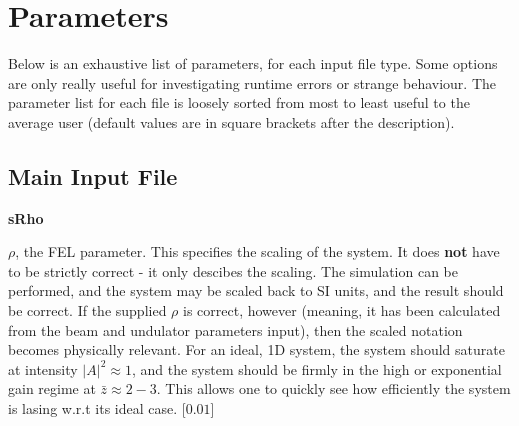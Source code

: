 \documentclass[12pt]{article}%
\begin{document}





\newpage

\section{Parameters}


Below is an exhaustive list of parameters, for each input file type. Some options are only really useful for investigating runtime errors or strange behaviour. The parameter list for each file is loosely sorted from most to least useful to the average user (default values are in square brackets after the description).


\subsection{Main Input File}

{\bf sRho}

$\rho$, the FEL parameter. This specifies the scaling of the system. It does {\bf not} have to be strictly correct - it only descibes the scaling. The simulation can be performed, and the system may be scaled back to SI units, and the result should be correct. If the supplied $\rho$ is correct, however (meaning, it has been calculated from the beam and undulator parameters input), then the scaled notation becomes physically relevant. For an ideal, 1D system, the system should saturate at intensity $|A|^2 \approx 1$, and the system should be firmly in the high or exponential gain regime at $\bar{z} \approx 2-3$. This allows one to quickly see how efficiently the system is lasing w.r.t its ideal case. [$0.01$]
\end{document}
